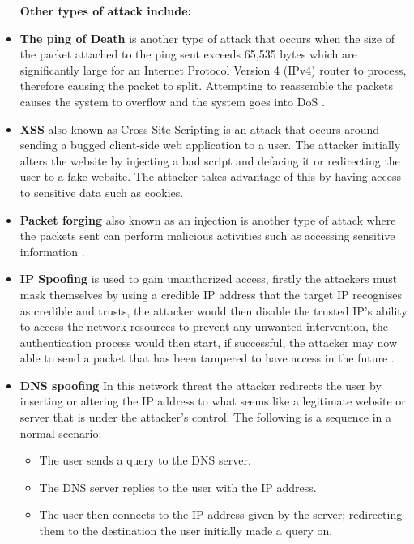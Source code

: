 \documentclass[12pt]{article}
\begin{document}
\begin{itemize}
		\textbf{Other types of attack include:}
		\item \textbf{The ping of Death} is another type of attack that occurs when the size of the packet attached to the ping sent exceeds 65,535 bytes which are significantly large for an Internet Protocol Version 4 (IPv4) router to process, therefore causing the packet to split. Attempting to reassemble the packets causes the system to overflow and the system goes into DoS \cite{sonar_2014_survey}.
		
		
		\item \textbf{XSS} also known as Cross-Site Scripting is an attack that occurs around sending a bugged client-side web application to a user. The attacker initially alters the website by injecting a bad script and defacing it or redirecting the user to a fake website. The attacker takes advantage of this by having access to sensitive data such as cookies.
		
		\item \textbf{Packet forging} also known as an injection is another type of attack where the packets sent can perform malicious activities such as accessing sensitive information \cite{hindy_2020_taxonomy}.
		
		
		\item \textbf{IP Spoofing} is used to gain unauthorized access, firstly the attackers must mask themselves by using a credible IP address that the target IP recognises as credible and trusts, the attacker would then disable the trusted IP's ability to access the network resources to prevent any unwanted intervention, the authentication process would then start, if successful, the attacker may now able to send a packet that has been tampered to have access in the future \cite{babu_2010_comprehensive}.
		
		
		\item \textbf{DNS spoofing} In this network threat the attacker redirects the user by inserting or altering the IP address to what seems like a legitimate website or server that is under the attacker's control.
		The following is a sequence in a normal scenario:
		\begin{itemize}
			\item The user sends a query to the DNS server.
			\item The DNS server replies to the user with the IP address.
			\item The user then connects to the IP address given by the server; redirecting them to the destination the user initially made a query on.
		\end{itemize}
		

\end{itemize}
\end{document}

